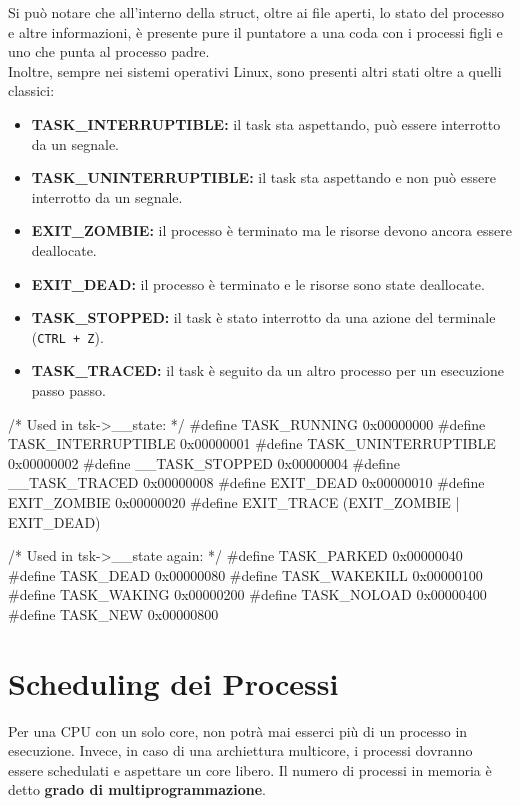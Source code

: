 Si può notare che all'interno della struct, oltre ai file aperti, lo stato del processo e altre informazioni,
è presente pure il puntatore a una coda con i processi figli e uno che punta al processo padre. \\
\vspace*{0.01\textheight}
Inoltre, sempre nei sistemi operativi Linux, sono presenti altri stati oltre a quelli classici:
\begin{itemize}
  \item \textbf{TASK\_INTERRUPTIBLE:} il task sta aspettando, può essere interrotto da un segnale.
  \item \textbf{TASK\_UNINTERRUPTIBLE:} il task sta aspettando e non può essere interrotto da un segnale.
  \item \textbf{EXIT\_ZOMBIE:} il processo è terminato ma le risorse devono ancora essere deallocate.
  \item \textbf{EXIT\_DEAD:} il processo è terminato e le risorse sono state deallocate.
  \item \textbf{TASK\_STOPPED:} il task è stato interrotto da una azione del terminale (\texttt{CTRL + Z}).
  \item \textbf{TASK\_TRACED:} il task è seguito da un altro processo per un esecuzione passo passo.
\end{itemize}

\begin{clang}
/* Used in tsk->__state: */
#define TASK_RUNNING 0x00000000
#define TASK_INTERRUPTIBLE 0x00000001
#define TASK_UNINTERRUPTIBLE 0x00000002
#define __TASK_STOPPED 0x00000004
#define __TASK_TRACED 0x00000008
#define EXIT_DEAD 0x00000010
#define EXIT_ZOMBIE 0x00000020
#define EXIT_TRACE (EXIT_ZOMBIE | EXIT_DEAD)

/* Used in tsk->__state again: */
#define TASK_PARKED 0x00000040
#define TASK_DEAD 0x00000080
#define TASK_WAKEKILL 0x00000100
#define TASK_WAKING 0x00000200
#define TASK_NOLOAD 0x00000400
#define TASK_NEW 0x00000800
\end{clang}

\section{Scheduling dei Processi}
Per una CPU con un solo core, non potrà mai esserci più di un processo in esecuzione. Invece, in caso di una archiettura multicore, i processi dovranno essere schedulati e aspettare un core libero.
Il numero di processi in memoria è detto \textbf{grado di multiprogrammazione}. 

